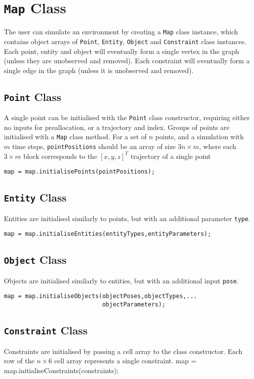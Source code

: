 \section{\texttt{Map} Class}
The user can simulate an environment by creating a \texttt{Map} class instance, which contains object arrays of \texttt{Point}, \texttt{Entity}, \texttt{Object} and \texttt{Constraint} class instances.
Each point, entity and object will eventually form a single vertex in the graph (unless they are unobserved and removed). Each constraint will eventually form a single edge in the graph (unless it is unobserved and removed).

\subsection{\texttt{Point} Class}
A single point can be initialised with the \texttt{Point} class constructor, requiring either no inputs for preallocation, or a trajectory and index.
Groups of points are initialised with a \texttt{Map} class method. For a set of $n$ points, and a simulation with $m$ time steps, \texttt{pointPositions} should be an array of size $3n \times m$, where each $3 \times m$ block corresponds to the $[x,y,z]^T$ trajectory of a single point
\begin{lstlisting}
map = map.initialisePoints(pointPositions);
\end{lstlisting}

\subsection{\texttt{Entity} Class}
Entities are initialised similarly to points, but with an additional parameter \texttt{type}.
\begin{lstlisting}
map = map.initialiseEntities(entityTypes,entityParameters);
\end{lstlisting}

\subsection{\texttt{Object} Class}
Objects are initialised similarly to entities, but with an additional input \texttt{pose}.
\begin{lstlisting}
map = map.initialiseObjects(objectPoses,objectTypes,...
							objectParameters);
\end{lstlisting}

\subsection{\texttt{Constraint} Class}
Constraints are initialised by passing a cell array to the class constructor.
Each row of the $n \times 6$ cell array represents a single constraint.
map = map.initialiseConstraints(constraints);

